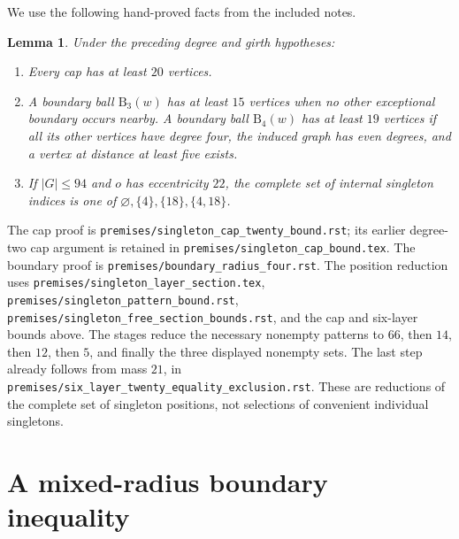 \documentclass[11pt]{article}
\newtheorem{lemma}[theorem]{Lemma}
\newcommand{\B}{\mathrm B}
\newcommand{\note}[1]{\nolinkurl{#1}}
\begin{document}
We use the following hand-proved facts from the included notes.
\begin{lemma}\label{lem:premises}
Under the preceding degree and girth hypotheses:
\begin{enumerate}
\item Every cap has at least $20$ vertices.
\item A boundary ball $\B_3(w)$ has at least $15$ vertices when no other
      exceptional boundary occurs nearby. A boundary ball $\B_4(w)$ has
      at least $19$ vertices if all its other vertices have degree four,
      the induced graph has even degrees, and a vertex at distance at
      least five exists.
\item If $|G|\leq94$ and $o$ has eccentricity $22$, the complete set of
      internal singleton indices is one of
      $\varnothing,\{4\},\{18\},\{4,18\}$.
\end{enumerate}
\end{lemma}
The cap proof is \note{premises/singleton_cap_twenty_bound.rst}; its
earlier degree-two cap argument is retained in
\note{premises/singleton_cap_bound.tex}.
The boundary proof is \note{premises/boundary_radius_four.rst}.
The position reduction uses
\note{premises/singleton_layer_section.tex},
\note{premises/singleton_pattern_bound.rst},
\note{premises/singleton_free_section_bounds.rst}, and the cap and
six-layer bounds above. The stages reduce the necessary nonempty
patterns to $66$, then $14$, then $12$, then $5$, and finally the three
displayed nonempty sets. The last step already follows from mass $21$,
in \note{premises/six_layer_twenty_equality_exclusion.rst}.
These are reductions of the complete set of singleton positions, not
selections of convenient individual singletons.

\section{A mixed-radius boundary inequality}
\end{document}
